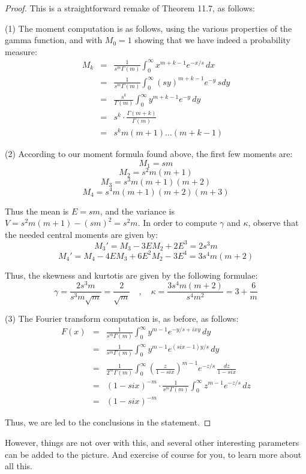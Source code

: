 \documentclass[12pt]{amsbook}
\begin{document}
\begin{proof}
This is a straightforward remake of Theorem 11.7, as follows:

\medskip

(1) The moment computation is as follows, using the various properties of the gamma function, and with $M_0=1$ showing that we have indeed a probability measure:
\begin{eqnarray*}
M_k
&=&\frac{1}{s^m\Gamma(m)}\int_0^\infty x^{m+k-1}e^{-x/s}\,dx\\
&=&\frac{1}{s^m\Gamma(m)}\int_0^\infty (sy)^{m+k-1}e^{-y}\,sdy\\
&=&\frac{s^k}{\Gamma(m)}\int_0^\infty y^{m+k-1}e^{-y}\,dy\\
&=&s^k\cdot\frac{\Gamma(m+k)}{\Gamma(m)}\\
&=&s^km(m+1)\ldots(m+k-1)
\end{eqnarray*}

(2) According to our moment formula found above, the first few moments are:
$$M_1=sm$$
$$M_2=s^2m(m+1)$$
$$M_3=s^3m(m+1)(m+2)$$
$$M_4=s^4m(m+1)(m+2)(m+3)$$

Thus the mean is $E=sm$, and the variance is $V=s^2m(m+1)-(sm)^2=s^2m$. In order to compute $\gamma$ and $\kappa$, observe that the needed central moments are given by:
$$M_3'=M_3-3EM_2+2E^3=2s^3m$$
$$M_4'=M_4-4EM_3+6E^2M_2-3E^4=3s^4m(m+2)$$

Thus, the skewness and kurtotis are given by the following formulae:
$$\gamma=\frac{2s^3m}{s^3m\sqrt{m}}=\frac{2}{\sqrt{m}}\quad,\quad\kappa=\frac{3s^4m(m+2)}{s^4m^2}=3+\frac{6}{m}$$

(3) The Fourier transform computation is, as before, as follows:
\begin{eqnarray*}
F(x)
&=&\frac{1}{s^m\Gamma(m)}\int_0^\infty y^{m-1}e^{-y/s+ixy}\,dy\\
&=&\frac{1}{s^m\Gamma(m)}\int_0^\infty y^{m-1}e^{(six-1)y/s}\,dy\\
&=&\frac{1}{2^m\Gamma(m)}\int_0^\infty\left(\frac{z}{1-six}\right)^{m-1}e^{-z/s}\,\frac{dz}{1-six}\\
&=&(1-six)^{-m}\cdot\frac{1}{s^m\Gamma(m)}\int_0^\infty z^{m-1}e^{-z/s}\,dz\\
&=&(1-six)^{-m}
\end{eqnarray*}

Thus, we are led to the conclusions in the statement.
\end{proof}

However, things are not over with this, and several other interesting parameters can be added to the picture. And exercise of course for you, to learn more about all this.
\end{document}
